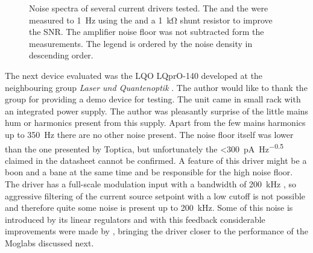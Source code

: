 \begin{figure}[hp]
    \centering
    \caption{Noise spectra of several current drivers tested. The  and the  were measured to \qty{1}{\Hz} using the  and a \qty{1}{\kilo\ohm} shunt resistor to improve the SNR. The amplifier noise floor was not subtracted form the measurements. The legend is ordered by the noise density in descending order.}
    \label{fig:laser_driver_noise_measurement}
\end{figure}

The next device evaluated was the LQO LQprO-140 developed at the neighbouring group \textit{Laser und Quantenoptik} \cite{ThorstenFuehrer}. The author would like to thank the group for providing a demo device for testing. The unit came in small rack with an integrated power supply. The author was pleasantly surprise of the little mains hum or harmonics present from this supply. Apart from the few mains harmonics up to \qty{350}{\Hz} there are no other noise present. The noise floor itself was lower than the one presented by Toptica, but unfortunately the \qty{<300}{\pA \per \Hz\tothe{0.5}} claimed in the datasheet \cite{datasheet_LQprO} cannot be confirmed. A feature of this driver might be a boon and a bane at the same time and be responsible for the high noise floor. The driver has a full-scale modulation input with a bandwidth of \qty{200}{\kHz} \cite{datasheet_LQprO}, so aggressive filtering of the current source setpoint with a low cutoff is not possible and therefore quite some noise is present up to \qty{200}{\kHz}. Some of this noise is introduced by its linear regulators and with this feedback considerable improvements were made by \citeauthor{thesis_holger} \cite{thesis_holger}, bringing the driver closer to the performance of the Moglabs  discussed next.

